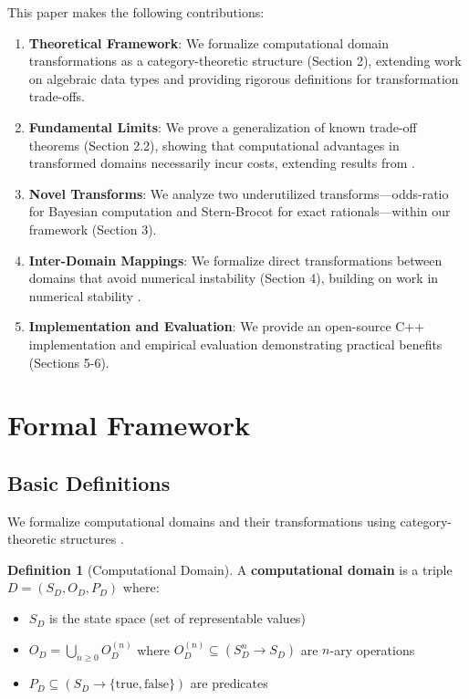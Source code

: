 \documentclass[12pt,a4paper]{article}
\theoremstyle{definition}
\newtheorem{definition}{Definition}
\begin{document}
This paper makes the following contributions:
\begin{enumerate}
\item \textbf{Theoretical Framework}: We formalize computational domain transformations as a category-theoretic structure (Section 2), extending work on algebraic data types \cite{bird1997algebra} and providing rigorous definitions for transformation trade-offs.
\item \textbf{Fundamental Limits}: We prove a generalization of known trade-off theorems (Section 2.2), showing that computational advantages in transformed domains necessarily incur costs, extending results from \cite{wolpert1997no}.
\item \textbf{Novel Transforms}: We analyze two underutilized transforms—odds-ratio for Bayesian computation and Stern-Brocot for exact rationals—within our framework (Section 3).
\item \textbf{Inter-Domain Mappings}: We formalize direct transformations between domains that avoid numerical instability (Section 4), building on work in numerical stability \cite{higham2002accuracy}.
\item \textbf{Implementation and Evaluation}: We provide an open-source C++ implementation and empirical evaluation demonstrating practical benefits (Sections 5-6).
\end{enumerate}

\section{Formal Framework}

\subsection{Basic Definitions}

We formalize computational domains and their transformations using category-theoretic structures \cite{awodey2010category}.

\begin{definition}[Computational Domain]
A \textbf{computational domain} is a triple $D = (S_D, O_D, P_D)$ where:
\begin{itemize}
\item $S_D$ is the state space (set of representable values)
\item $O_D = \bigcup_{n \geq 0} O_D^{(n)}$ where $O_D^{(n)} \subseteq (S_D^n \to S_D)$ are $n$-ary operations
\item $P_D \subseteq (S_D \to \{\text{true}, \text{false}\})$ are predicates
\end{itemize}
\end{definition}
\end{document}

